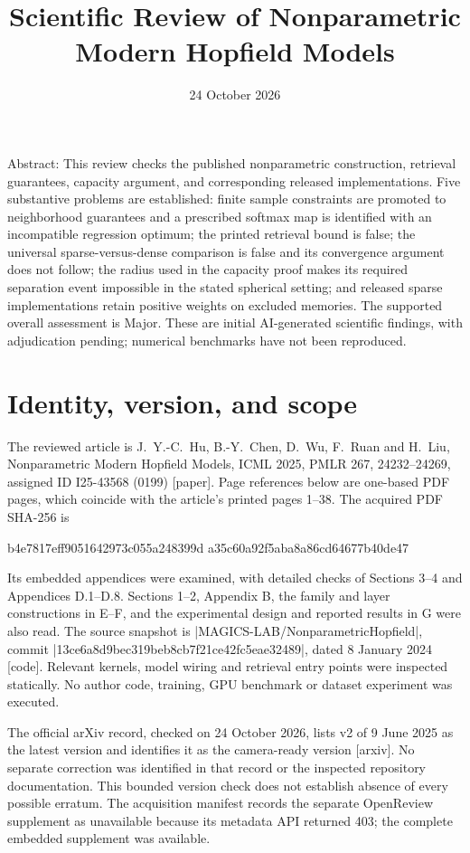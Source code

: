 \documentclass[10pt]{article}
\title{Scientific Review of Nonparametric Modern Hopfield Models}
\author{}
\date{24 October 2026}
\begin{document}
\maketitle
Abstract: This review checks the published nonparametric construction, retrieval guarantees, capacity argument, and corresponding released implementations. Five substantive problems are established: finite sample constraints are promoted to neighborhood guarantees and a prescribed softmax map is identified with an incompatible regression optimum; the printed retrieval bound is false; the universal sparse-versus-dense comparison is false and its convergence argument does not follow; the radius used in the capacity proof makes its required separation event impossible in the stated spherical setting; and released sparse implementations retain positive weights on excluded memories. The supported overall assessment is Major. These are initial AI-generated scientific findings, with adjudication pending; numerical benchmarks have not been reproduced.\par
\section*{Identity, version, and scope}
The reviewed article is J. Y.-C. Hu, B.-Y. Chen, D. Wu, F. Ruan and H. Liu, Nonparametric Modern Hopfield Models, ICML 2025, PMLR 267, 24232–24269, assigned ID I25-43568 (0199) [paper]. Page references below are one-based PDF pages, which coincide with the article’s printed pages 1–38. The acquired PDF SHA-256 is\par
b4e7817eff9051642973c055a248399d
a35c60a92f5aba8a86cd64677b40de47\par
Its embedded appendices were examined, with detailed checks of Sections 3–4 and Appendices D.1–D.8. Sections 1–2, Appendix B, the family and layer constructions in E–F, and the experimental design and reported results in G were also read. The source snapshot is |MAGICS-LAB/NonparametricHopfield|, commit |13ce6a8d9bec319beb8cb7f21ce42fc5eae32489|, dated 8 January 2024 [code]. Relevant kernels, model wiring and retrieval entry points were inspected statically. No author code, training, GPU benchmark or dataset experiment was executed.\par
The official arXiv record, checked on 24 October 2026, lists v2 of 9 June 2025 as the latest version and identifies it as the camera-ready version [arxiv]. No separate correction was identified in that record or the inspected repository documentation. This bounded version check does not establish absence of every possible erratum. The acquisition manifest records the separate OpenReview supplement as unavailable because its metadata API returned 403; the complete embedded supplement was available.\par
\end{document}
